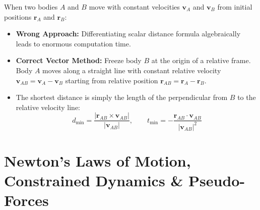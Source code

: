 \documentclass[10pt,twoside,openright]{book}
\begin{document}
\begin{trapbox}
When two bodies $A$ and $B$ move with constant velocities $\mathbf{v}_A$ and $\mathbf{v}_B$ from initial positions $\mathbf{r}_A$ and $\mathbf{r}_B$:
\begin{itemize}
  \item \textbf{Wrong Approach:} Differentiating scalar distance formula algebraically leads to enormous computation time.
  \item \textbf{Correct Vector Method:} Freeze body $B$ at the origin of a relative frame. Body $A$ moves along a straight line with constant relative velocity $\mathbf{v}_{AB} = \mathbf{v}_A - \mathbf{v}_B$ starting from relative position $\mathbf{r}_{AB} = \mathbf{r}_A - \mathbf{r}_B$.
  \item The shortest distance is simply the length of the perpendicular from $B$ to the relative velocity line:
  \begin{equation}
    d_{\min} = \frac{|\mathbf{r}_{AB} \times \mathbf{v}_{AB}|}{|\mathbf{v}_{AB}|}, \qquad t_{\min} = -\frac{\mathbf{r}_{AB} \cdot \mathbf{v}_{AB}}{|\mathbf{v}_{AB}|^2}
  \end{equation}
\end{itemize}
\end{trapbox}

\section{Newton's Laws of Motion, Constrained Dynamics \& Pseudo-Forces}
\end{document}
